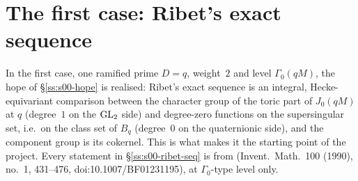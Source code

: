 \section{The first case: Ribet's exact sequence}\label{ss:s00-ribet}

In the first case, one ramified prime $D=q$, weight~$2$ and level $\Gamma_0(qM)$, the hope of \S\ref{ss:s00-hope} is realised:
Ribet's exact sequence \cite{Ri90} is an integral, Hecke-equivariant comparison between the character group of the toric part
of $J_0(qM)$ at $q$ (degree~$1$ on the $\mathrm{GL}_2$ side) and degree-zero functions on the supersingular set, i.e.\ on the class set of
$B_q$ (degree~$0$ on the quaternionic side), and the component group is its cokernel. This is what makes it the starting point
of the project. Every statement in \S\ref{ss:s00-ribet-seq} is \stcited{} from \cite{Ri90} (Invent.\ Math.\ 100 (1990), no.~1,
431--476, doi:10.1007/BF01231195), at $\Gamma_0$-type level only.

